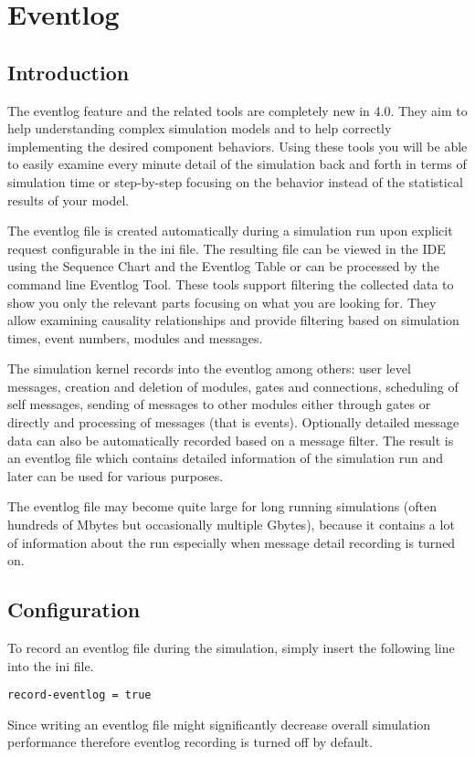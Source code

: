 \chapter{Eventlog}
\label{cha:eventlog}

\section{Introduction}
The eventlog feature and the related tools are completely new in {\opp} 4.0. They aim to
help understanding complex simulation models and to help correctly implementing the
desired component behaviors. Using these tools you will be able to easily examine every
minute detail of the simulation back and forth in terms of simulation time or step-by-step
focusing on the behavior instead of the statistical results of your model.

The eventlog file is created automatically during a simulation run upon explicit request
configurable in the ini file. The resulting file can be viewed in the {\opp} IDE using
the Sequence Chart and the Eventlog Table or can be processed by the command line Eventlog
Tool. These tools support filtering the collected data to show you only the relevant parts
focusing on what you are looking for. They allow examining causality relationships and
provide filtering based on simulation times, event numbers, modules and messages.

The simulation kernel records into the eventlog among others: user level messages,
creation and deletion of modules, gates and connections, scheduling of self messages,
sending of messages to other modules either through gates or directly and processing of
messages (that is events). Optionally detailed message data can also be automatically
recorded based on a message filter. The result is an eventlog file which contains detailed
information of the simulation run and later can be used for various purposes.

\begin{note}
The eventlog file may become quite large for long running simulations (often hundreds of
Mbytes but occasionally multiple Gbytes), because it contains a lot of information about
the run especially when message detail recording is turned on.
\end{note}

\section{Configuration}
To record an eventlog file during the simulation, simply insert the following line into
the ini file.
\begin{verbatim}
record-eventlog = true
\end{verbatim}
\begin{note}
Since writing an eventlog file might significantly decrease overall simulation performance
therefore eventlog recording is turned off by default.
\end{note}

